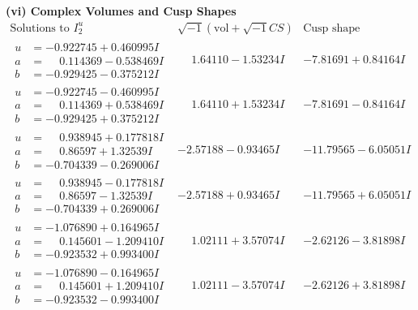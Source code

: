 \documentclass[1p]{elsarticle_modified}
\theoremstyle{definition}
\newcommand{\I}{\sqrt{-1}}
\begin{document}
\newpage\flushleft \textbf{(vi) Complex Volumes and Cusp Shapes}
$$\begin{array}{c|c|c}  
\text{Solutions to }I^u_{2}& \I (\text{vol} + \sqrt{-1}CS) & \text{Cusp shape}\\
 \hline 
\begin{aligned}
u &= -0.922745 + 0.460995 I \\
a &= \phantom{-}0.114369 - 0.538469 I \\
b &= -0.929425 - 0.375212 I\end{aligned}
 & \phantom{-}1.64110 - 1.53234 I & -7.81691 + 0.84164 I \\ \hline\begin{aligned}
u &= -0.922745 - 0.460995 I \\
a &= \phantom{-}0.114369 + 0.538469 I \\
b &= -0.929425 + 0.375212 I\end{aligned}
 & \phantom{-}1.64110 + 1.53234 I & -7.81691 - 0.84164 I \\ \hline\begin{aligned}
u &= \phantom{-}0.938945 + 0.177818 I \\
a &= \phantom{-}0.86597 + 1.32539 I \\
b &= -0.704339 - 0.269006 I\end{aligned}
 & -2.57188 - 0.93465 I & -11.79565 - 6.05051 I \\ \hline\begin{aligned}
u &= \phantom{-}0.938945 - 0.177818 I \\
a &= \phantom{-}0.86597 - 1.32539 I \\
b &= -0.704339 + 0.269006 I\end{aligned}
 & -2.57188 + 0.93465 I & -11.79565 + 6.05051 I \\ \hline\begin{aligned}
u &= -1.076890 + 0.164965 I \\
a &= \phantom{-}0.145601 - 1.209410 I \\
b &= -0.923532 + 0.993400 I\end{aligned}
 & \phantom{-}1.02111 + 3.57074 I & -2.62126 - 3.81898 I \\ \hline\begin{aligned}
u &= -1.076890 - 0.164965 I \\
a &= \phantom{-}0.145601 + 1.209410 I \\
b &= -0.923532 - 0.993400 I\end{aligned}
 & \phantom{-}1.02111 - 3.57074 I & -2.62126 + 3.81898 I \\ \hline\begin{aligned}

\end{aligned}
\end{array}$$
\end{document}
